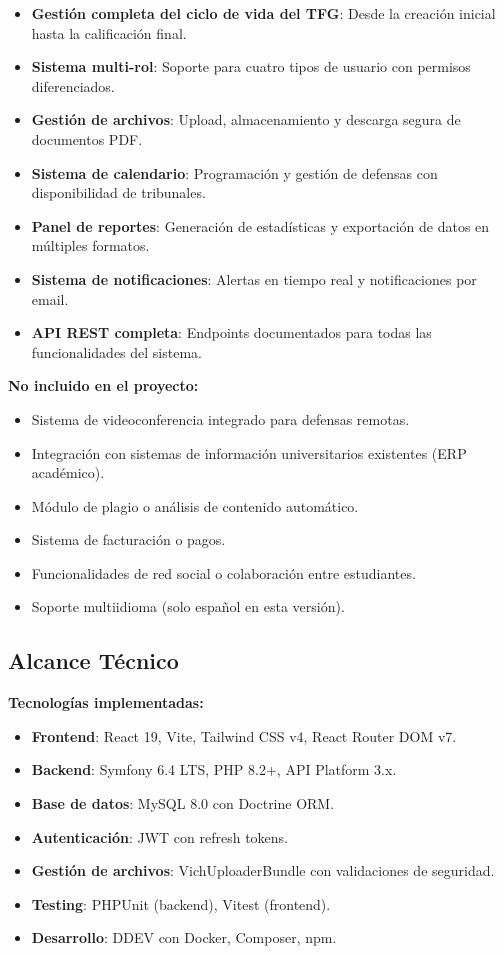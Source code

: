 \documentclass[12pt,a4paper,oneside]{report}
\providecommand{\tightlist}{%
  \setlength{\itemsep}{0pt}\setlength{\parskip}{0pt}}
\begin{document}
\begin{itemize}
\tightlist
\item
  \textbf{Gestión completa del ciclo de vida del TFG}: Desde la creación
  inicial hasta la calificación final.
\item
  \textbf{Sistema multi-rol}: Soporte para cuatro tipos de usuario con
  permisos diferenciados.
\item
  \textbf{Gestión de archivos}: Upload, almacenamiento y descarga segura
  de documentos PDF.
\item
  \textbf{Sistema de calendario}: Programación y gestión de defensas con
  disponibilidad de tribunales.
\item
  \textbf{Panel de reportes}: Generación de estadísticas y exportación
  de datos en múltiples formatos.
\item
  \textbf{Sistema de notificaciones}: Alertas en tiempo real y
  notificaciones por email.
\item
  \textbf{API REST completa}: Endpoints documentados para todas las
  funcionalidades del sistema.
\end{itemize}

\textbf{No incluido en el proyecto:}

\begin{itemize}
\tightlist
\item
  Sistema de videoconferencia integrado para defensas remotas.
\item
  Integración con sistemas de información universitarios existentes (ERP
  académico).
\item
  Módulo de plagio o análisis de contenido automático.
\item
  Sistema de facturación o pagos.
\item
  Funcionalidades de red social o colaboración entre estudiantes.
\item
  Soporte multiidioma (solo español en esta versión).
\end{itemize}

\subsection{Alcance Técnico}\label{alcance-tuxe9cnico}

\textbf{Tecnologías implementadas:}

\begin{itemize}
\tightlist
\item
  \textbf{Frontend}: React 19, Vite, Tailwind CSS v4, React Router DOM
  v7.
\item
  \textbf{Backend}: Symfony 6.4 LTS, PHP 8.2+, API Platform 3.x.
\item
  \textbf{Base de datos}: MySQL 8.0 con Doctrine ORM.
\item
  \textbf{Autenticación}: JWT con refresh tokens.
\item
  \textbf{Gestión de archivos}: VichUploaderBundle con validaciones de
  seguridad.
\item
  \textbf{Testing}: PHPUnit (backend), Vitest (frontend).
\item
  \textbf{Desarrollo}: DDEV con Docker, Composer, npm.
\end{itemize}
\end{document}
